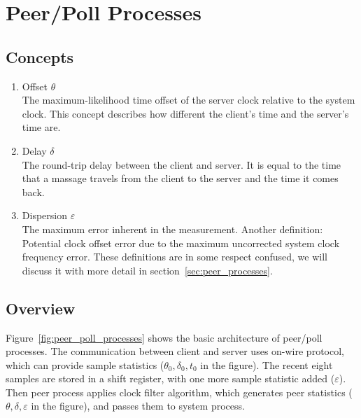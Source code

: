 \chapter{Peer/Poll Processes}
\label{cha:peer/poll}

\section{Concepts}%
\label{sec:peer/poll_concepts}
\begin{enumerate}
    \item Offset $\theta$\\
        The maximum-likelihood time offset of the server clock relative to the
        system clock. This concept describes how different the client's time
        and the server's time are.
    \item Delay $\delta$\\
        The round-trip delay between the client and server. It is equal to the
        time that a massage travels from the client to the server and the time
        it comes back.
    \item Dispersion $\varepsilon$\\
        The maximum error inherent in the measurement.
        Another definition: Potential clock offset error due to the maximum
        uncorrected system clock frequency error.
        These definitions are in some respect confused, we will discuss it with
        more detail in section~\ref{sec:peer_processes}.
\end{enumerate}

\section{Overview}%
\label{sec:overview}
Figure~\ref{fig:peer_poll_processes} shows the basic architecture of peer/poll
processes. The communication between client and server uses on-wire protocol,
which can provide sample statistics ($\theta_0, \delta_0, t_0$ in the figure).
The recent eight samples are stored in a shift register, with one more sample
statistic added ($\varepsilon$).  Then peer process applies clock filter
algorithm, which generates peer statistics ($\theta, \delta, \varepsilon$ in
the figure), and passes them to system process.

